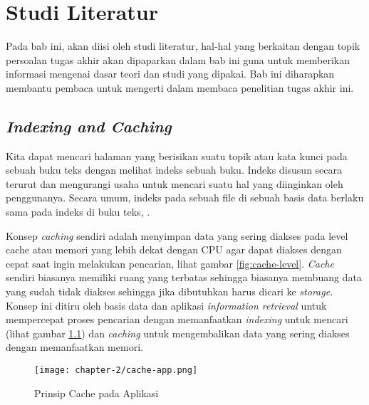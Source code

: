 \chapter{Studi Literatur}

Pada bab ini, akan diisi oleh studi literatur, hal-hal yang berkaitan dengan topik persoalan tugas akhir akan dipaparkan dalam bab ini guna untuk memberikan informasi mengenai dasar teori dan studi yang dipakai. Bab ini diharapkan membantu pembaca untuk mengerti dalam membaca penelitian tugas akhir ini.











\section{\textit{Indexing and Caching}}
Kita dapat mencari halaman yang berisikan suatu topik atau kata kunci pada sebuah buku teks dengan melihat indeks sebuah buku. Indeks disusun secara terurut dan mengurangi usaha untuk mencari suatu hal yang diinginkan oleh penggunanya. Secara umum, indeks pada sebuah file di sebuah basis data berlaku sama pada indeks di buku teks, \parencite{database}.

Konsep \textit{caching} sendiri adalah menyimpan data yang sering diakses pada level cache atau memori yang lebih dekat dengan CPU agar dapat diakses dengan cepat saat ingin melakukan pencarian, lihat gambar \ref{fig:cache-level}. \textit{Cache} sendiri biasanya memiliki ruang yang terbatas sehingga biasanya membuang data yang sudah tidak diakses sehingga jika dibutuhkan harus dicari ke \textit{storage}. Konsep ini ditiru oleh basis data dan aplikasi \textit{information retrieval} untuk mempercepat proses pencarian dengan memanfaatkan \textit{indexing} untuk mencari (lihat gambar \ref{fig:cache-app}) dan \textit{caching} untuk mengembalikan data yang sering diakses dengan memanfaatkan memori.

\begin{figure}[h]
    \centering
    \texttt{[image: chapter-2/cache-app.png]}
    \caption{Prinsip Cache pada Aplikasi}
    \label{fig:cache-app}
\end{figure}

